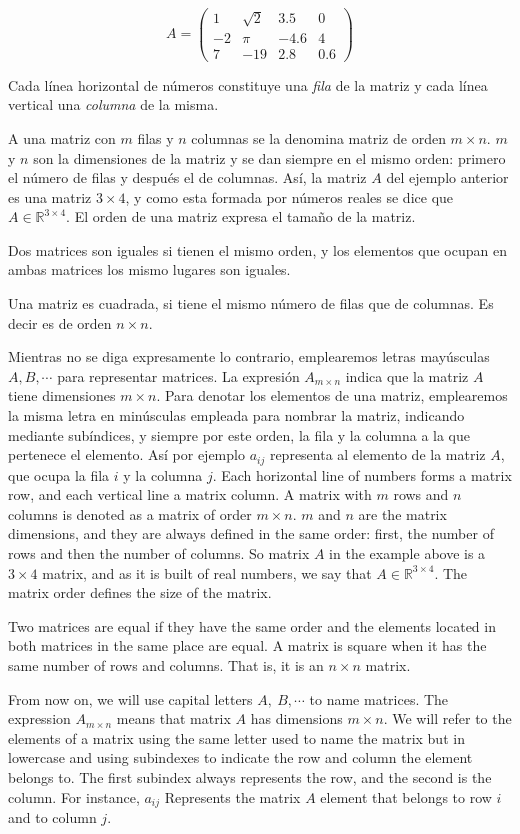 \begin{equation*}
A=
\begin{pmatrix}
1& \sqrt{2}& 3.5& 0\\
-2& \pi& -4.6& 4\\
7& -19& 2.8& 0.6
\end{pmatrix}
\end{equation*}

\begin{paracol}{2}
Cada línea horizontal de números constituye una \emph{fila} de la matriz y cada línea vertical una \emph{columna} de la misma.

A una matriz con $m$ filas y $n$ columnas se la denomina matriz de orden $m\times n$. $m$ y $n$ son la dimensiones de la matriz y se dan siempre en el mismo orden: primero el número de filas y después el de columnas. Así, la matriz $A$ del ejemplo anterior es una matriz $3\times 4$, y como esta formada por números reales se dice que $A\in\mathbb{R}^{3\times 4}$. El orden de una matriz expresa el tamaño de la matriz.

Dos matrices son iguales si tienen el mismo orden, y los elementos que ocupan en ambas matrices los mismo lugares son iguales.

Una matriz es cuadrada, si tiene el mismo número de filas que de columnas. Es decir es de orden $n\times n$.

Mientras no se diga expresamente lo contrario, emplearemos letras mayúsculas $A, B, \cdots$ para representar matrices. La expresión $A_{m\times n}$ indica que la matriz $A$ tiene dimensiones $m \times n$. Para denotar los elementos de una matriz, emplearemos la misma letra en minúsculas empleada para nombrar la matriz, indicando mediante subíndices, y siempre por este orden, la fila y la columna a la que pertenece el elemento. Así por ejemplo $a_{ij}$ representa al elemento de la matriz $A$, que ocupa la fila $i$ y la columna $j$.
\switchcolumn
Each horizontal line of numbers forms a matrix row, and each vertical line a matrix column.
A matrix with $m$ rows and $n$ columns is denoted as a matrix of order $m\times n$. $m$ and $n$ are the matrix dimensions, and they are always defined in the same order: first, the number of rows and then the number of columns. So matrix $A$ in the example above is a $3\times 4$ matrix, and as it is built of real numbers, we say that $A\in \mathbb{R}^{3\times 4}$. The matrix order defines the size of the matrix.

Two matrices are equal if they have the same order and the elements located in both matrices in the same place are equal. A matrix is square when it has the same number of rows and columns. That is, it is an $n\times n$ matrix.

From now on, we will use capital letters $A,\ B,\cdots$ to name matrices. The expression $A_{m\times n}$ means that matrix $A$ has dimensions $m\times n$. We will refer to the elements of a matrix using the same letter used to name the matrix but in lowercase and using subindexes to indicate the row and column the element belongs to. The first subindex always represents the row, and the second is the column. For instance, $a_{ij}$ Represents the matrix $A$ element that belongs to row $i$ and to column $j$.
\end{paracol}
